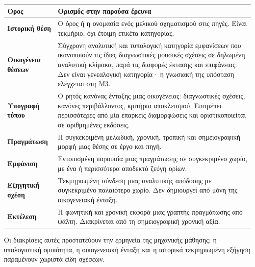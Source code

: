 \documentclass[11pt,a4paper]{article}
\begin{document}
\begin{center}\small
\begin{tabularx}{\linewidth}{@{}>{\bfseries}L{3.1cm}Y@{}}
\toprule
Όρος & Ορισμός στην παρούσα έρευνα\\\midrule
Ιστορική θέση & Ο όρος ή η ονομασία ενός μελικού σχηματισμού στις πηγές. Είναι τεκμήριο, όχι έτοιμη ετικέτα κατηγορίας.\\
Οικογένεια θέσεων & Σύγχρονη αναλυτική και τυπολογική κατηγορία εμφανίσεων που ικανοποιούν τις ίδιες διαγνωστικές μουσικές σχέσεις σε δηλωμένη αναλυτική κλίμακα, παρά τις διαφορές έκτασης και επιφάνειας. Δεν είναι γενεαλογική κατηγορία· η γνωσιακή της υπόσταση ελέγχεται στη Μ3.\\
Υπογραφή τύπου & Ο ρητός κανόνας ένταξης μιας οικογένειας: διαγνωστικές σχέσεις, κανόνες περιβάλλοντος, κριτήρια αποκλεισμού. Επιτρέπει περισσότερες από μία επαρκείς διαμορφώσεις και οριστικοποιείται σε αριθμημένες εκδόσεις.\\
Πραγμάτωση & Η συγκεκριμένη μελωδική, χρονική, τροπική και σημειογραφική μορφή μιας θέσης σε έργο και πηγή.\\
Εμφάνιση & Εντοπισμένη παρουσία μιας πραγμάτωσης σε συγκεκριμένο χωρίο, με ένα ή περισσότερα αποδεκτά ζεύγη ορίων.\\
Εξηγητική σχέση & Τεκμηριωμένη σύνδεση μιας αναλυτικής απόδοσης με συγκεκριμένο παλαιότερο χωρίο. Δεν δημιουργεί από μόνη της οικογενειακή ένταξη.\\
Εκτέλεση & Η φωνητική και χρονική εκφορά μιας γραπτής πραγμάτωσης από ψάλτη. Διακρίνεται από τη σημειογραφική χρονική αξία.\\\bottomrule
\end{tabularx}
\end{center}

Οι διακρίσεις αυτές προστατεύουν την ερμηνεία της μηχανικής μάθησης: η υπολογιστική ομοιότητα, η οικογενειακή ένταξη και η ιστορικά τεκμηριωμένη εξήγηση παραμένουν χωριστά είδη σχέσεων.
\end{document}
